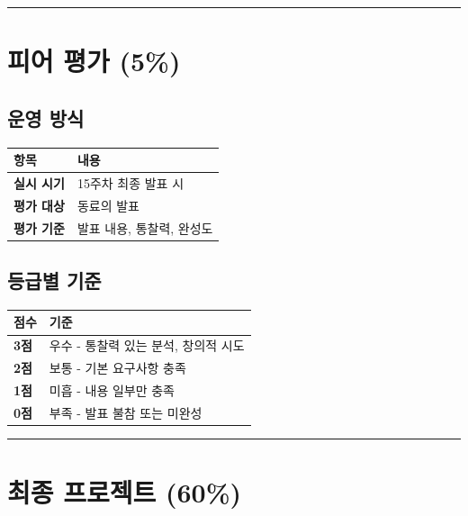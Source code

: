 \documentclass[11pt, a4paper]{article}
\begin{document}
\vspace{3pt}
\noindent\rule{\textwidth}{0.3pt}

\section{피어 평가 (5\%)}

\subsection{운영 방식}

\begin{table}[h]
\centering
\begin{tabular}{|L{3cm}|L{10.5cm}|}
\hline
{}
\textbf{항목} & \textbf{내용} \\
\hline
\textbf{실시 시기} & 15주차 최종 발표 시 \\
\hline
\textbf{평가 대상} & 동료의 발표 \\
\hline
\textbf{평가 기준} & 발표 내용, 통찰력, 완성도 \\
\hline
\end{tabular}
\end{table}

\subsection{등급별 기준}

\begin{table}[h]
\centering
\begin{tabular}{|C{1.5cm}|L{12cm}|}
\hline
{}
\textbf{점수} & \textbf{기준} \\
\hline
\textbf{3점} & 우수 - 통찰력 있는 분석, 창의적 시도 \\
\hline
\textbf{2점} & 보통 - 기본 요구사항 충족 \\
\hline
\textbf{1점} & 미흡 - 내용 일부만 충족 \\
\hline
\textbf{0점} & 부족 - 발표 불참 또는 미완성 \\
\hline
\end{tabular}
\end{table}

\vspace{3pt}
\noindent\rule{\textwidth}{0.3pt}

\section{최종 프로젝트 (60\%)}
\end{document}
